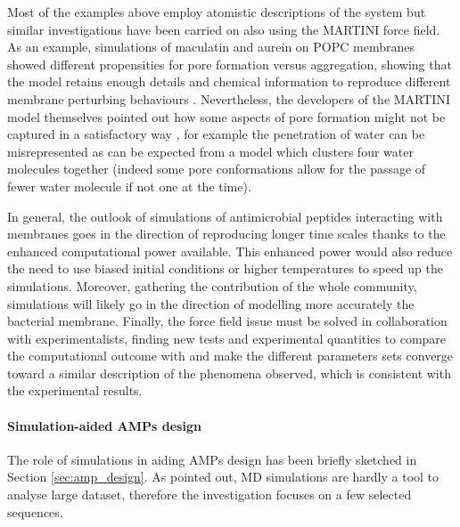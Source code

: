 Most of the examples above employ atomistic descriptions of the system but similar investigations have been carried on also using the MARTINI force field. %
%
As an example, simulations of maculatin and aurein on POPC membranes showed different propensities for pore formation versus aggregation, showing that the model retains enough details and chemical information to reproduce different membrane perturbing behaviours \citep{Balatti2017}.
%
Nevertheless, the developers of the MARTINI model themselves pointed out how some aspects of pore formation might not be captured in a satisfactory way \citep{Marrink2013}, for example the penetration of water can be misrepresented as can be expected from a model which clusters four water molecules together (indeed some pore conformations allow for the passage of fewer water molecule if not one at the time).

In general, the outlook of simulations of antimicrobial peptides interacting with membranes goes in the direction of reproducing longer time scales thanks to the enhanced computational power available. %
%
This enhanced power would also reduce the need to use biased initial conditions or higher temperatures to speed up the simulations.
%
Moreover, gathering the contribution of the whole community, simulations will likely go in the direction of modelling more accurately the bacterial membrane. %
%
Finally, the force field issue must be solved in collaboration with experimentalists, finding new tests and experimental quantities to compare the computational outcome with and make the different parameters sets converge toward a similar description of the phenomena observed, which is consistent with the experimental results.


\paragraph{Simulation-aided AMPs design} \label{sec:design_md_examples}

The role of simulations in aiding AMPs design has been briefly sketched in Section \ref{sec:amp_design}. As pointed out, MD simulations are hardly a tool to analyse large dataset, therefore %
the investigation focuses on a few selected sequences.


